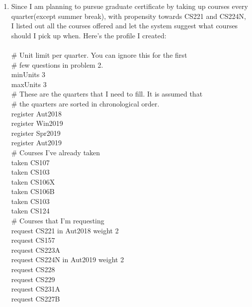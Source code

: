 \documentclass[12pt]{article}
\begin{document}
\begin{enumerate}[label=(\alph*)]
\addtocounter{enumi}{2}
\item Since I am planning to pursue graduate certificate by taking up courses every quarter(except summer break), with propensity towards CS221 and CS224N, I listed out all the courses offered and let the system suggest what courses should I pick up when. Here's the profile I created: \\ \\
\# Unit limit per quarter. You can ignore this for the first \\
\# few questions in problem 2. \\
minUnits 3 \\
maxUnits 3 \\

\# These are the quarters that I need to fill. It is assumed that \\
\# the quarters are sorted in chronological order. \\
register Aut2018 \\
register Win2019 \\
register Spr2019 \\
register Aut2019 \\

\# Courses I've already taken \\
taken CS107 \\
taken CS103 \\
taken CS106X \\
taken CS106B \\
taken CS103 \\
taken CS124 \\

\# Courses that I'm requesting \\
request CS221 in Aut2018 weight 2 \\
request CS157 \\
request CS223A \\
request CS224N in Aut2019 weight 2 \\
request CS228 \\
request CS229 \\
request CS231A \\
request CS227B \\


\end{enumerate}
\end{document}
